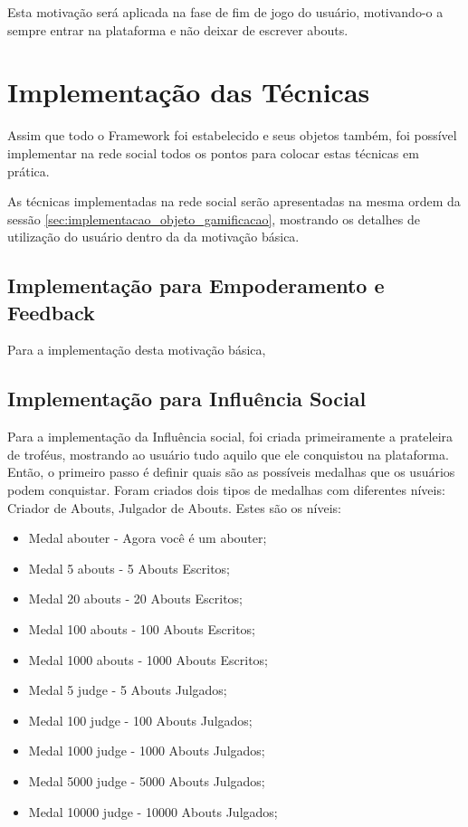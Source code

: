 Esta motivação será aplicada na fase de fim de jogo do usuário, motivando-o a sempre entrar na plataforma
e não deixar de escrever abouts.

\section{Implementação das Técnicas}
\label{sec:gamifição}
Assim que todo o Framework foi estabelecido e seus objetos também, foi possível implementar
na rede social todos os pontos para colocar estas técnicas em prática.

As técnicas implementadas na rede social serão apresentadas na mesma ordem da sessão
\ref{sec:implementacao_objeto_gamificacao}, mostrando os detalhes de utilização do usuário dentro
da da motivação básica.


\subsection{Implementação para Empoderamento e Feedback}
\label{sub:implementacao_empoderamento_feedback}
Para a implementação desta motivação básica, 

\subsection{Implementação para Influência Social}
\label{sub:implementacao_influencia_social}
Para a implementação da Influência social, foi criada primeiramente a prateleira de troféus, mostrando
ao usuário tudo aquilo que ele conquistou na plataforma. Então, o primeiro passo é definir quais são
as possíveis medalhas que os usuários podem conquistar. Foram criados dois tipos de medalhas com diferentes
níveis: Criador de Abouts, Julgador de Abouts. Estes são os níveis:

\begin{itemize}
    \item Medal abouter - Agora você é um abouter;
    \item Medal 5 abouts - 5 Abouts Escritos;
    \item Medal 20 abouts - 20 Abouts Escritos;
    \item Medal 100 abouts - 100 Abouts Escritos;
    \item Medal 1000 abouts - 1000 Abouts Escritos;
    \item Medal 5 judge - 5 Abouts Julgados;
    \item Medal 100 judge - 100 Abouts Julgados;
    \item Medal 1000 judge - 1000 Abouts Julgados;
    \item Medal 5000 judge - 5000 Abouts Julgados;
    \item Medal 10000 judge - 10000 Abouts Julgados;
\end{itemize}

